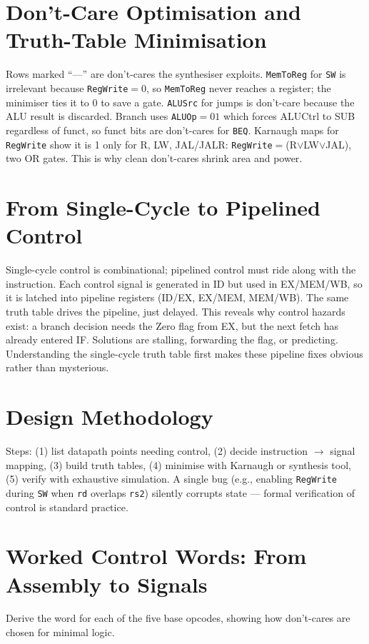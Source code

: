 \section{Don't-Care Optimisation and Truth-Table Minimisation}
Rows marked ``---'' are don't-cares the synthesiser exploits. \texttt{MemToReg} for \texttt{SW} is irrelevant because \texttt{RegWrite}$=0$, so \texttt{MemToReg} never reaches a register; the minimiser ties it to 0 to save a gate. \texttt{ALUSrc} for jumps is don't-care because the ALU result is discarded. Branch uses \texttt{ALUOp}$=01$ which forces ALUCtrl to SUB regardless of funct, so funct bits are don't-cares for \texttt{BEQ}. Karnaugh maps for \texttt{RegWrite} show it is 1 only for R, LW, JAL/JALR: \texttt{RegWrite}$=$(R$\lor$LW$\lor$JAL), two OR gates. This is why clean don't-cares shrink area and power.

\section{From Single-Cycle to Pipelined Control}
Single-cycle control is combinational; pipelined control must ride along with the instruction. Each control signal is generated in ID but used in EX/MEM/WB, so it is latched into pipeline registers (ID/EX, EX/MEM, MEM/WB). The same truth table drives the pipeline, just delayed. This reveals why control hazards exist: a branch decision needs the Zero flag from EX, but the next fetch has already entered IF. Solutions are stalling, forwarding the flag, or predicting. Understanding the single-cycle truth table first makes these pipeline fixes obvious rather than mysterious.

\section{Design Methodology}
Steps: (1) list datapath points needing control, (2) decide instruction $\to$ signal mapping, (3) build truth tables, (4) minimise with Karnaugh or synthesis tool, (5) verify with exhaustive simulation. A single bug (e.g., enabling \texttt{RegWrite} during \texttt{SW} when \texttt{rd} overlaps \texttt{rs2}) silently corrupts state --- formal verification of control is standard practice.


\section{Worked Control Words: From Assembly to Signals}
Derive the word for each of the five base opcodes, showing how don't-cares are chosen for minimal logic.

